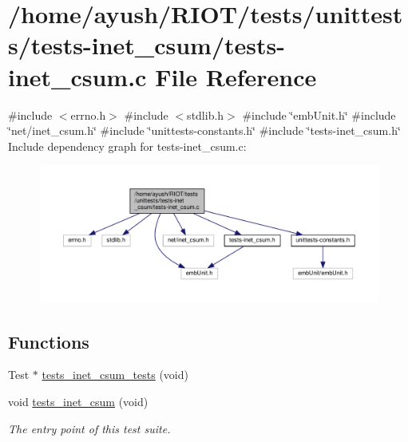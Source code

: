 \hypertarget{tests-inet__csum_8c}{}\section{/home/ayush/\+R\+I\+O\+T/tests/unittests/tests-\/inet\+\_\+csum/tests-\/inet\+\_\+csum.c File Reference}
\label{tests-inet__csum_8c}
{\ttfamily \#include $<$errno.\+h$>$}\newline
{\ttfamily \#include $<$stdlib.\+h$>$}\newline
{\ttfamily \#include \char`\"{}emb\+Unit.\+h\char`\"{}}\newline
{\ttfamily \#include \char`\"{}net/inet\+\_\+csum.\+h\char`\"{}}\newline
{\ttfamily \#include \char`\"{}unittests-\/constants.\+h\char`\"{}}\newline
{\ttfamily \#include \char`\"{}tests-\/inet\+\_\+csum.\+h\char`\"{}}\newline
Include dependency graph for tests-\/inet\+\_\+csum.c\+:
\nopagebreak
\begin{figure}[H]
\begin{center}
\leavevmode
\includegraphics[width=350pt]{tests-inet__csum_8c__incl}
\end{center}
\end{figure}
\subsection*{Functions}
\textbf{ }\par
\begin{DoxyCompactItemize}
\item 
Test $\ast$ \hyperlink{tests-inet__csum_8c_a71e3a236c33362e9bedcfb6d781f2751}{tests\+\_\+inet\+\_\+csum\+\_\+tests} (void)
\item 
void \hyperlink{group__unittests_gadfd01b88a3279960c0a209c588d7e733}{tests\+\_\+inet\+\_\+csum} (void)
\begin{DoxyCompactList}\small\item\em The entry point of this test suite. \end{DoxyCompactList}\end{DoxyCompactItemize}



